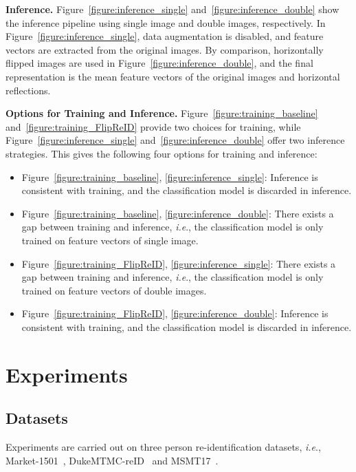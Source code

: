\documentclass{article}
\def\onedot{.}
\def\ie{\emph{i.e}\onedot} \def\Ie{\emph{I.e}\onedot}
\begin{document}
\noindent\textbf{Inference.}
Figure~\ref{figure:inference_single} and~\ref{figure:inference_double} show the inference pipeline using single image and double images, respectively.
In Figure~\ref{figure:inference_single}, data augmentation is disabled, and feature vectors are extracted from the original images.
By comparison, horizontally flipped images are used in Figure~\ref{figure:inference_double}, and the final representation is the mean feature vectors of the original images and horizontal reflections.

\noindent\textbf{Options for Training and Inference.}
Figure~\ref{figure:training_baseline} and~\ref{figure:training_FlipReID} provide two choices for training, while Figure~\ref{figure:inference_single} and~\ref{figure:inference_double} offer two inference strategies.
This gives the following four options for training and inference:
\begin{itemize}
\itemsep0em
\item
Figure~\ref{figure:training_baseline}, \ref{figure:inference_single}:
Inference is consistent with training, and the classification model is discarded in inference.
\item
Figure~\ref{figure:training_baseline}, \ref{figure:inference_double}:
There exists a gap between training and inference, \ie,
the classification model is only trained on feature vectors of single image.
\item
Figure~\ref{figure:training_FlipReID}, \ref{figure:inference_single}:
There exists a gap between training and inference, \ie,
the classification model is only trained on feature vectors of double images.
\item
Figure~\ref{figure:training_FlipReID}, \ref{figure:inference_double}:
Inference is consistent with training, and the classification model is discarded in inference.
\end{itemize}

\section{Experiments}

\subsection{Datasets}

Experiments are carried out on three person re-identification datasets, \ie, Market-1501~\cite{zheng2015scalable}, DukeMTMC-reID~\cite{ristani2016performance} and MSMT17~\cite{wei2018person}.
\end{document}
